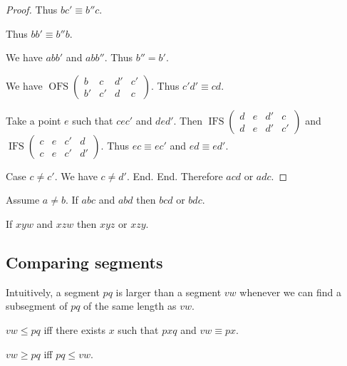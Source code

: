 \documentclass[10pt,a4paper,parskip=half,numbers=endperiod,headings=standardclasses,parskip]{scrbook}
\newcommand{\Cong}[4]{#1 #2 \equiv #3 #4}
\newcommand{\Betw}[3]{#1 #2 #3}
\newcommand{\Leq}[4]{#1 #2 \leq #3 #4}
\newcommand{\Geq}[4]{#1 #2 \geq #3 #4}
\newcommand{\bprime}{b'}
\newcommand{\cprime}{c'}
\def\dprime{d'}
\newcommand{\bdoubleprime}{b''}
\newcommand{\OFS}[8]{\operatorname{OFS}%
\left(
\begin{smallmatrix}%
#1 & #2 & #3 & #4 \\
#5 & #6 & #7 & #8
\end{smallmatrix}%
\right)%
}
\newcommand{\IFS}[8]{\operatorname{IFS}
\left(
\begin{smallmatrix}%
#1 & #2 & #3 & #4 \\
#5 & #6 & #7 & #8
\end{smallmatrix}
\right)%
}
\begin{document}
\begin{forthel}
\begin{proof}
        Thus $\Cong{b}{\cprime}{\bdoubleprime}{c}$.

        Thus $\Cong{b}{\bprime}{\bdoubleprime}{b}$.

        We have $\Betw{a}{b}{\bprime}$ and $\Betw{a}{b}{\bdoubleprime}$.
        Thus $\bdoubleprime = \bprime$. %

        We have $\OFS{b}{c}{\dprime}{\cprime}{\bprime}{\cprime}{d}{c}$.
        Thus $\Cong{\cprime}{\dprime}{c}{d}$.

        Take a point $e$ such that
          $\Betw{c}{e}{\cprime}$ and $\Betw{d}{e}{\dprime}$.
        Then $\IFS{d}{e}{\dprime}{c}{d}{e}{\dprime}{\cprime}$
        and $\IFS{c}{e}{\cprime}{d}{c}{e}{\cprime}{\dprime}$.
        Thus $\Cong{e}{c}{e}{\cprime}$ and $\Cong{e}{d}{e}{\dprime}$.

        Case $c \neq \cprime$.
          We have $c\neq \dprime$.
        End.
      End.
      Therefore $\Betw{a}{c}{d}$ or $\Betw{a}{d}{c}$. %
    \end{proof}
  \end{forthel}

  \begin{forthel}
    \begin{lemma} %
      Assume $a \neq b$.
      If $\Betw{a}{b}{c}$ and $\Betw{a}{b}{d}$
      then $\Betw{b}{c}{d}$ or $\Betw{b}{d}{c}$.
    \end{lemma}

    \begin{theorem} %
      If $\Betw{x}{y}{w}$ and $\Betw{x}{z}{w}$ then $\Betw{x}{y}{z}$ or $\Betw{x}{z}{y}$.
    \end{theorem}
  \end{forthel}

  \subsection{Comparing segments}

  Intuitively, a segment $pq$ is larger than a segment $vw$ whenever we can find a subsegment
  of $pq$ of the same length as $vw$.

  \begin{forthel}
    \begin{definition} %
      $\Leq{v}{w}{p}{q}$ iff there exists $x$ such that $\Betw{p}{x}{q}$ and $\Cong{v}{w}{p}{x}$.
    \end{definition}

    \begin{definition} %
      $\Geq{v}{w}{p}{q}$ iff $\Leq{p}{q}{v}{w}$.
    \end{definition}
  \end{forthel}
\end{document}
